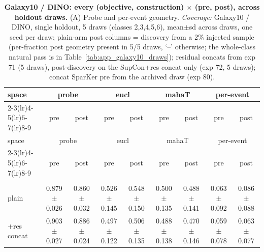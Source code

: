 \begin{landscape}
\begin{center}
\footnotesize
\setlength{\tabcolsep}{3pt}
\begin{longtable}{lcccccccc}
\caption{\textbf{Galaxy10 / DINO: every (objective, construction) $\times$ (pre, post), across holdout draws.} (A) Probe and per-event geometry. \emph{Coverage:} Galaxy10 / DINO, single holdout, 5 draws (classes 2,3,4,5,6), mean$\pm$sd across draws, one seed per draw; plain-arm post columns = discovery from a 2\% injected sample (per-fraction post geometry present in 5/5 draws, `--' otherwise; the whole-class natural pass is in Table~\ref{tab:app_galaxy10_draws}); residual concats from exp 71 (5 draws), post-discovery on the SupCon+res concat only (exp 72, 5 draws); concat SparKer pre from the archived draw (exp 80).}\label{tab:grid_galaxy10_dino_a}\\
\toprule
space & \multicolumn{2}{c}{probe} & \multicolumn{2}{c}{eucl} & \multicolumn{2}{c}{mahaT} & \multicolumn{2}{c}{per-event} \\
\cmidrule(lr){2-3}\cmidrule(lr){4-5}\cmidrule(lr){6-7}\cmidrule(lr){8-9}
& pre & post & pre & post & pre & post & pre & post \\
\midrule
\endfirsthead
\toprule
space & \multicolumn{2}{c}{probe} & \multicolumn{2}{c}{eucl} & \multicolumn{2}{c}{mahaT} & \multicolumn{2}{c}{per-event} \\
\cmidrule(lr){2-3}\cmidrule(lr){4-5}\cmidrule(lr){6-7}\cmidrule(lr){8-9}
& pre & post & pre & post & pre & post & pre & post \\
\midrule
\endhead
\bottomrule
\endfoot
\multicolumn{9}{l}{\emph{SupCon}} \\
\quad plain & 0.879$\pm$0.026 & 0.860$\pm$0.032 & 0.526$\pm$0.145 & 0.548$\pm$0.150 & 0.500$\pm$0.135 & 0.488$\pm$0.141 & 0.063$\pm$0.092 & 0.086$\pm$0.088 \\
\quad +res concat & 0.903$\pm$0.027 & 0.886$\pm$0.024 & 0.497$\pm$0.122 & 0.506$\pm$0.135 & 0.488$\pm$0.138 & 0.470$\pm$0.146 & 0.059$\pm$0.078 & 0.063$\pm$0.077 \\

\end{longtable}
\end{center}
\end{landscape}
